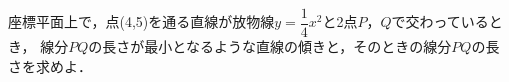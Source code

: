 \documentclass[../../main.tex]{subfiles}
\begin{document}
座標平面上で，点(4,5)を通る直線が放物線$\displaystyle y=\dfrac{1}{4}x^2$と2点$P$，$Q$で交わっているとき，
線分$PQ$の長さが最小となるような直線の傾きと，そのときの線分$PQ$の長さを求めよ．
\end{document}
